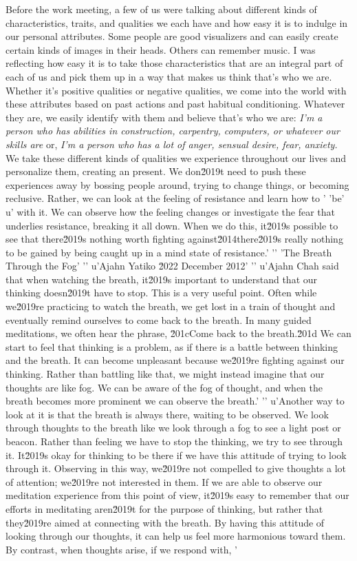 Before the work meeting, a few of us were talking about different kinds 
of characteristics, traits, and qualities we each have and how easy it 
is to indulge in our personal attributes. Some people are good 
visualizers and can easily create certain kinds of images in their 
heads. Others can remember music. I was reflecting how easy it is to 
take those characteristics that are an integral part of each of us and 
pick them up in a way that makes us think that's who we are. Whether 
it's positive qualities or negative qualities, we come into the world 
with these attributes based on past actions and past habitual 
conditioning. Whatever they are, we easily identify with them and 
believe that's who we are: \emph{I'm a person who has abilities in 
construction, carpentry, computers, or whatever our skills are} or, 
\emph{I'm a person who has a lot of anger, sensual desire, fear, 
anxiety.} We take these different kinds of qualities we experience 
throughout our lives and personalize them, creating an present. We don\u2019t need to push these experiences away by bossing people around, trying to change things, or becoming reclusive. Rather, we can look at the feeling of resistance and learn how to '
'be'
u' with it. We can observe how the feeling changes or investigate the fear that underlies resistance, breaking it all down. When we do this, it\u2019s possible to see that there\u2019s nothing worth fighting against\u2014there\u2019s really nothing to be gained by being caught up in a mind state of resistance.'
'\n'
'The Breath Through the Fog'
'\n'
u'Ajahn Yatiko \u2022 December 2012'
'\n'
u'Ajahn Chah said that when watching the breath, it\u2019s important to understand that our thinking doesn\u2019t have to stop. This is a very useful point. Often while we\u2019re practicing to watch the breath, we get lost in a train of thought and eventually remind ourselves to come back to the breath. In many guided meditations, we often hear the phrase, \u201cCome back to the breath.\u201d We can start to feel that thinking is a problem, as if there is a battle between thinking and the breath. It can become unpleasant because we\u2019re fighting against our thinking. Rather than battling like that, we might instead imagine that our thoughts are like fog. We can be aware of the fog of thought, and when the breath becomes more prominent we can observe the breath.'
'\n'
u'Another way to look at it is that the breath is always there, waiting to be observed. We look through thoughts to the breath like we look through a fog to see a light post or beacon. Rather than feeling we have to stop the thinking, we try to see through it. It\u2019s okay for thinking to be there if we have this attitude of trying to look through it. Observing in this way, we\u2019re not compelled to give thoughts a lot of attention; we\u2019re not interested in them. If we are able to observe our meditation experience from this point of view, it\u2019s easy to remember that our efforts in meditating aren\u2019t for the purpose of thinking, but rather that they\u2019re aimed at connecting with the breath. By having this attitude of looking through our thoughts, it can help us feel more harmonious toward them. By contrast, when thoughts arise, if we respond with, '
